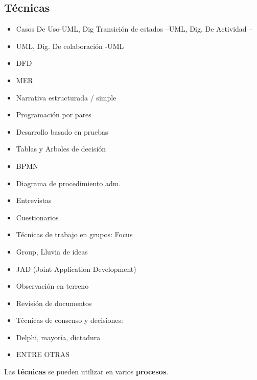 \documentclass{templateNote}
\begin{document}
\subsection{Técnicas}
\begin{itemize}
    \item Casos De Uso-UML, Dig Transición de estados –UML, Dig. De Actividad –
    \item UML, Dig. De colaboración -UML
    \item DFD
    \item MER
    \item Narrativa estructurada / simple
    \item Programación por pares
    \item Desarrollo basado en pruebas
    \item Tablas y Arboles de decisión
    \item BPMN
    \item Diagrama de procedimiento adm.
    \item Entrevistas
    \item Cuestionarios
    \item Técnicas de trabajo en grupos: Focus
    \item Group, Lluvia de ideas
    \item JAD (Joint Application Development)
    \item Observación en terreno
    \item Revisión de documentos
    \item Técnicas de consenso y decisiones:
    \item Delphi, mayoría, dictadura
    \item ENTRE OTRAS
\end{itemize}
\begin{tcolorbox}
    Las \textbf{técnicas} se pueden utilizar en varios \textbf{procesos}.
\end{tcolorbox}
\end{document}
